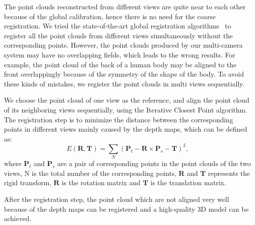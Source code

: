 The point clouds reconstructed from different views are quite near to each other because of the global calibration, hence there is no need for the coarse registration. We tried the state-of-the-art global registration algorithms~\cite{Evangelidis-ECCV-2014} to register all the point clouds from different views simultaneously without the corresponding points. However, the point clouds produced by our multi-camera system may have no overlapping fields, which leads to the wrong results. For example, the point cloud of the back of a human body may be aligned to the front overlappingly because of the symmetry of the shape of the body. To avoid these kinds of mistakes, we register the point clouds in multi views sequentially.

We choose the point cloud of one view as the reference, and align the point cloud of its neighboring views sequentially, using the Iterative Closest Point algorithm. 
The registration step is to minimize the distance between the corresponding points in different views mainly caused by the depth maps, which can be defined as:
\begin{equation} 
E(\mathbf{R},\mathbf{T})=\sum_{N}(\mathbf{P}_{t}-\mathbf{R}\times\mathbf{P}_{s}-\mathbf{T})^{2},
\end{equation}
where $\mathbf{P}_{t}$ and $\mathbf{P}_{s}$ are a pair of corresponding points in the point clouds of the two views, N is the total number of the corresponding points, $\mathbf{R}$ and $\mathbf{T}$ represents the rigid transform, $\mathbf{R}$ is the rotation matrix and $\mathbf{T}$ is the translation matrix.

After the registration step, the point cloud which are not aligned very well because of the depth maps can be registered and a high-quality 3D model can be achieved.

